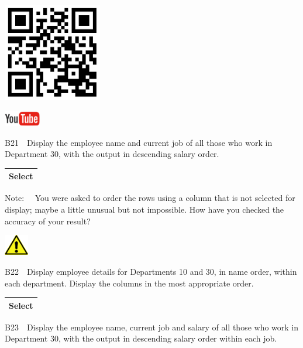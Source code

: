 \begin{center}
\begin{minipage}{4.849cm}
   
\includegraphics[width=4.314cm,height=4.314cm]{images/img (22).png}
 

   
\includegraphics[width=1.582cm,height=0.674cm]{images/img (15).png}
 
\end{minipage}
\end{center}
B21\ \ Display the employee name and current job of all those who work in Department 30, with the output in descending salary order.

\begin{flushleft}
\tablefirsthead{}
\tablehead{}
\tabletail{}
\tablelasttail{}
\begin{supertabular}{|m{9.644cm}|}
\hline
Select 

\\\hline
\end{supertabular}
\end{flushleft}
Note: \ \ You were asked to order the rows using a column that is not selected for display; maybe a little unusual but not impossible.  How have you checked the accuracy of your result?

\begin{center}
  
\includegraphics[width=1.06cm,height=0.903cm]{images/img (2).png}

\end{center}
B22\ \ Display employee details for Departments 10 and 30, in name order, within each department.  Display the columns in the most appropriate order.

\begin{flushleft}
\tablefirsthead{}
\tablehead{}
\tabletail{}
\tablelasttail{}
\begin{supertabular}{|m{14.303cm}|}
\hline
Select 

\\\hline
\end{supertabular}
\end{flushleft}
B23\ \ Display the employee name, current job and salary of all those who work in Department 30, with the output in descending salary order within each job.

